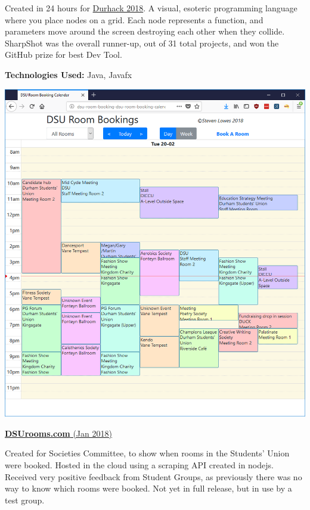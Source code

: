 \documentclass[hidelinks, 12pt, a4paper]{article}
\begin{document}
\begin{minipage}{0.40\textwidth}
		Created in 24 hours for \href{http://www.durhack.com}{Durhack 2018}. A visual, esoteric programming language where you place nodes on a grid. Each node represents a function, and parameters move around the screen destroying each other when they collide. SharpShot was the overall runner-up, out of 31 total projects, and won the GitHub prize for best Dev Tool.
		
		\textbf{Technologies Used:} Java, Javafx
		
	\end{minipage}
	\hspace{0.06\textwidth}
	\begin{minipage}{0.40\textwidth}
		
		\begin{center}
			\href{http://www.dsurooms.com}{\includegraphics[width=0.9\linewidth]{dsurooms.png}}
		\end{center}
		\vspace{-12pt}
		\href{http://www.dsurooms.com}{\textbf{DSUrooms.com} (Jan 2018)}
		
		Created for Societies Committee, to show when rooms in the Students' Union were booked. Hosted in the cloud using a scraping API created in nodejs. Received very positive feedback from Student Groups, as previously there was no way to know which rooms were booked. Not yet in full release, but in use by a test group.
		

\end{minipage}
\end{document}
